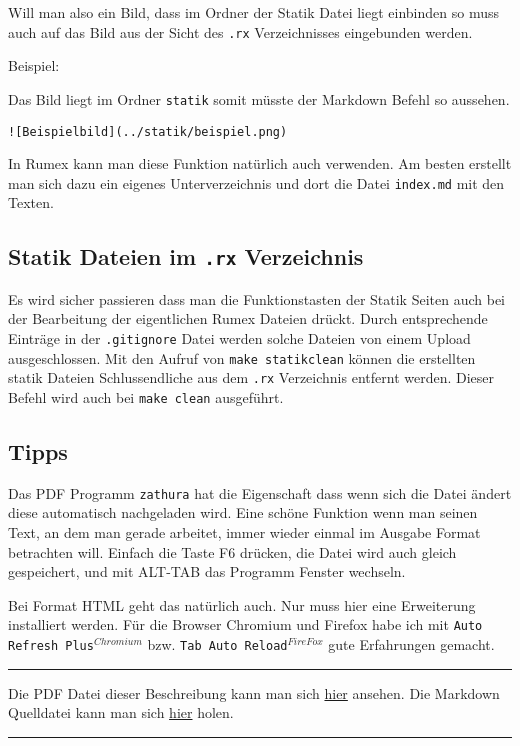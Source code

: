 Will man also ein Bild, dass im Ordner der Statik Datei liegt einbinden
so muss auch auf das Bild aus der Sicht des \texttt{.rx} Verzeichnisses
eingebunden werden.

Beispiel:

Das Bild liegt im Ordner \texttt{statik} somit müsste der Markdown
Befehl so aussehen.

\begin{verbatim}
![Beispielbild](../statik/beispiel.png)
\end{verbatim}

In Rumex kann man diese Funktion natürlich auch verwenden. Am besten
erstellt man sich dazu ein eigenes Unterverzeichnis und dort die Datei
\texttt{index.md} mit den Texten.

\subsection{Statik Dateien im \texttt{.rx}
Verzeichnis}\label{statik-dateien-im-.rx-verzeichnis}

Es wird sicher passieren dass man die Funktionstasten der Statik Seiten
auch bei der Bearbeitung der eigentlichen Rumex Dateien drückt. Durch
entsprechende Einträge in der \texttt{.gitignore} Datei werden solche
Dateien von einem Upload ausgeschlossen. Mit den Aufruf von
\texttt{make statikclean} können die erstellten statik Dateien
Schlussendliche aus dem \texttt{.rx} Verzeichnis entfernt werden. Dieser
Befehl wird auch bei \texttt{make clean} ausgeführt.

\subsection{Tipps}\label{tipps-1}

Das PDF Programm \texttt{zathura} hat die Eigenschaft dass wenn sich die
Datei ändert diese automatisch nachgeladen wird. Eine schöne Funktion
wenn man seinen Text, an dem man gerade arbeitet, immer wieder einmal im
Ausgabe Format betrachten will. Einfach die Taste F6 drücken, die Datei
wird auch gleich gespeichert, und mit ALT-TAB das Programm Fenster
wechseln.

Bei Format HTML geht das natürlich auch. Nur muss hier eine Erweiterung
installiert werden. Für die Browser Chromium und Firefox habe ich mit
\texttt{Auto Refresh Plus}$^{Chromium}$ bzw.
\texttt{Tab Auto Reload}$^{FireFox}$ gute Erfahrungen gemacht.

\begin{center}\rule{3in}{0.4pt}\end{center}

Die PDF Datei dieser Beschreibung kann man sich \href{index.pdf}{hier}
ansehen. Die Markdown Quelldatei kann man sich \href{index.md}{hier}
holen.

\begin{center}\rule{3in}{0.4pt}\end{center}


